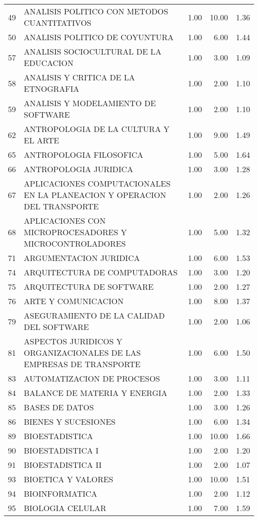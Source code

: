 \documentclass[12pt]{article}
\begin{document}
\begin{table}[ht]
\begin{tabular}{rlrrr}
  49 & ANALISIS POLITICO CON METODOS CUANTITATIVOS & 1.00 & 10.00 & 1.36 \\ 
  50 & ANALISIS POLITICO DE COYUNTURA & 1.00 & 6.00 & 1.44 \\ 
  57 & ANALISIS SOCIOCULTURAL DE LA EDUCACION & 1.00 & 3.00 & 1.09 \\ 
  58 & ANALISIS Y CRITICA DE LA ETNOGRAFIA & 1.00 & 2.00 & 1.10 \\ 
  59 & ANALISIS Y MODELAMIENTO DE SOFTWARE & 1.00 & 2.00 & 1.10 \\ 
  62 & ANTROPOLOGIA DE LA CULTURA Y EL ARTE & 1.00 & 9.00 & 1.49 \\ 
  65 & ANTROPOLOGIA FILOSOFICA & 1.00 & 5.00 & 1.64 \\ 
  66 & ANTROPOLOGIA JURIDICA & 1.00 & 3.00 & 1.28 \\ 
  67 & APLICACIONES COMPUTACIONALES EN LA PLANEACION Y OPERACION DEL TRANSPORTE & 1.00 & 2.00 & 1.26 \\ 
  68 & APLICACIONES CON MICROPROCESADORES Y MICROCONTROLADORES & 1.00 & 5.00 & 1.32 \\ 
  71 & ARGUMENTACION JURIDICA & 1.00 & 6.00 & 1.53 \\ 
  74 & ARQUITECTURA DE COMPUTADORAS & 1.00 & 3.00 & 1.20 \\ 
  75 & ARQUITECTURA DE SOFTWARE & 1.00 & 2.00 & 1.27 \\ 
  76 & ARTE Y COMUNICACION & 1.00 & 8.00 & 1.37 \\ 
  79 & ASEGURAMIENTO DE LA CALIDAD DEL SOFTWARE & 1.00 & 2.00 & 1.06 \\ 
  81 & ASPECTOS JURIDICOS Y ORGANIZACIONALES DE LAS EMPRESAS DE TRANSPORTE & 1.00 & 6.00 & 1.50 \\ 
  83 & AUTOMATIZACION DE PROCESOS & 1.00 & 3.00 & 1.11 \\ 
  84 & BALANCE DE MATERIA Y ENERGIA & 1.00 & 2.00 & 1.33 \\ 
  85 & BASES DE DATOS & 1.00 & 3.00 & 1.26 \\ 
  86 & BIENES Y SUCESIONES & 1.00 & 6.00 & 1.34 \\ 
  89 & BIOESTADISTICA & 1.00 & 10.00 & 1.66 \\ 
  90 & BIOESTADISTICA I & 1.00 & 2.00 & 1.20 \\ 
  91 & BIOESTADISTICA II & 1.00 & 2.00 & 1.07 \\ 
  93 & BIOETICA Y VALORES & 1.00 & 10.00 & 1.51 \\ 
  94 & BIOINFORMATICA & 1.00 & 2.00 & 1.12 \\ 
  95 & BIOLOGIA CELULAR & 1.00 & 7.00 & 1.59 \\ 

\end{tabular}
\end{table}
\end{document}
